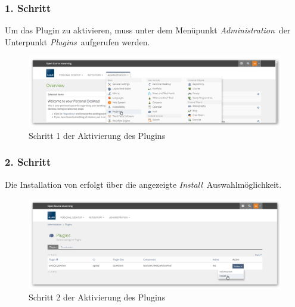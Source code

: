     \subsubsection{1. Schritt}
    
        Um das Plugin zu aktivieren, muss unter dem Menüpunkt \glqq\textit{Administration}\grqq\ der Unterpunkt \glqq\textit{Plugins}\grqq\ aufgerufen werden.
        
            \begin{figure}[H]
                \begin{center}
                    \includegraphics[page=1, width=0.7\paperwidth, trim=4 4 4 4, clip]{fig/Schritt-1-Aktivierung.png} 
                    \caption{Schritt 1 der Aktivierung des  Plugins}
                    \label{fig:schritt-1-aktivierung}
                \end{center}
            \end{figure}
    
    \subsubsection{2. Schritt}
    
        Die Installation von  erfolgt über die angezeigte \glqq\textit{Install}\grqq\ Auswahlmöglichkeit.
        
            \begin{figure}[H]
                \begin{center}
                    \includegraphics[page=1, width=0.7\paperwidth, trim=4 4 4 4, clip]{fig/Schritt-2-Aktivierung.png} 
                    \caption{Schritt 2 der Aktivierung des  Plugins}
                    \label{fig:schritt-2-aktivierung}
                \end{center}
            \end{figure}
    
